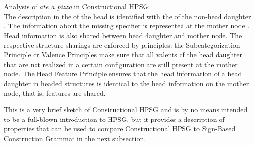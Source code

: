 \documentclass[output=paper
	        ,collection
	        ,collectionchapter
 	        ,biblatex
                ,babelshorthands
                ,newtxmath
                ,draftmode
                ,colorlinks, citecolor=brown
]{langscibook}
\begin{document}
\eas
\label{ex-ate-a-pizza-sag97}%
Analysis of \emph{ate a pizza} in Constructional HPSG:\\
\zs
The description in the \compsl of the head is identified with the \synsemv of the non-head daughter
. The information about the missing specifier is represented at the mother node
. Head information is also shared between head daughter and mother node. The respective
structure sharings are enforced by principles: the Subcategorization Principle or Valence Principles
make sure that all valents of the head daughter that are not realized in a certain configuration
are still present at the mother node. The Head Feature Principle ensures that the head information
of a head daughter in headed structures is identical to the head information on the mother node,
that is, \head features are shared.

This is a very brief sketch of Constructional HPSG and is by no means intended to be a full-blown
introduction to HPSG, but it provides a description of properties that can be used to compare
Constructional HPSG to Sign-Based Construction Grammar in the next subsection.
\end{document}
